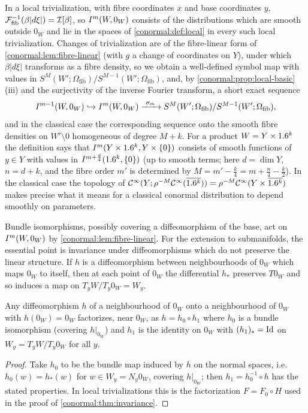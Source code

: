 In a local trivialization, with fibre coordinates $x$ and base coordinates $y$,
$\mathcal{F}_{\mathrm{fib}}^{-1}(\beta|d\xi|)=\mathcal{I}[\beta]$, so $I^{m}(W,0_W)$ consists of the
distributions which are smooth outside $0_W$ and lie in the spaces of
\cref{conormal:def:local} in every such local trivialization.  Changes of
trivialization are of the fibre-linear form of \cref{conormal:lem:fibre-linear}
(with $g$ a change of coordinates on $Y$), under which $\beta|d\xi|$ transforms
as a fibre density, so we obtain a well-defined symbol map with values in
$S^M(W';\Omega_{\mathrm{fib}})/S^{M-1}(W';\Omega_{\mathrm{fib}})$, and, by
\cref{conormal:prop:local-basic}(iii) and the surjectivity of the inverse
Fourier transform, a short exact sequence
\begin{equation}\label{conormal:eq:bundle-exact}
  I^{m-1}(W,0_W)\hookrightarrow I^{m}(W,0_W)\xrightarrow{\ \sigma_m\ }
  S^{M}(W';\Omega_{\mathrm{fib}})/S^{M-1}(W';\Omega_{\mathrm{fib}}),
\end{equation}
and in the classical case the corresponding sequence onto the smooth fibre
densities on $W'\setminus0$ homogeneous of degree $M+k$.  For a product
$W=Y\times1.6^k$ the definition says that $I^{m}(Y\times1.6^k,Y\times\{0\})$
consists of smooth functions of $y\in Y$ with values in
$I^{m+\frac d4}(1.6^k,\{0\})$ (up to smooth terms; here $d=\dim Y$, $n=d+k$,
and the fibre order $m'$ is determined by $M=m'-\frac k4=m+\frac n4-\frac k2$).
In the classical case the topology of
$\mathcal{C}^\infty(Y;\rho^{-M}\mathcal{C}^\infty(\overline{1.6^k}))=\rho^{-M}\mathcal{C}^\infty(Y\times\overline{1.6^k})$ makes precise
what it means for a classical conormal distribution to depend smoothly on
parameters.

Bundle isomorphisms, possibly covering a diffeomorphism of the base, act on
$I^{m}(W,0_W)$ by \cref{conormal:lem:fibre-linear}.  For the extension to
submanifolds, the essential point is invariance under diffeomorphisms which do
not preserve the linear structure.  If $h$ is a diffeomorphism between
neighbourhoods of $0_W$ which maps $0_W$ to itself, then at each point of $0_W$
the differential $h_*$ preserves $T0_W$ and so induces a map on
$T_yW/T_y0_W=W_y$.

\begin{lemma}\label{conormal:lem:factor}
  Any diffeomorphism $h$ of a neighbourhood of $0_W$ onto a neighbourhood of
  $0_W$ with $h(0_W)=0_W$ factorizes, near $0_W$, as $h=h_0\circ h_1$ where $h_0$
  is a bundle isomorphism (covering $h|_{0_W}$) and $h_1$ is the identity on
  $0_W$ with $(h_1)_*=\operatorname{Id}$ on $W_y=T_yW/T_y0_W$ for all $y$.
\end{lemma}
\begin{proof}
  Take $h_0$ to be the bundle map induced by $h$ on the normal spaces, i.e.\
  $h_0(w)=h_*(w)$ for $w\in W_y=N_y0_W$, covering $h|_{0_W}$; then
  $h_1=h_0^{-1}\circ h$ has the stated properties.  In local trivializations this
  is the factorization $F=F_0\circ H$ used in the proof of
  \cref{conormal:thm:invariance}.
\end{proof}

